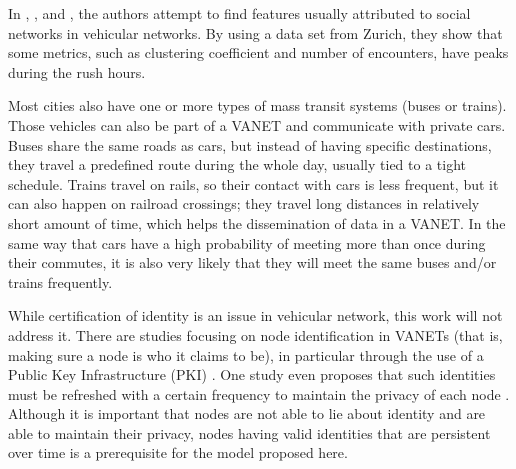 
In \cite{da2013effective}, \cite{cunha2014vehicular}, and \cite{cunha2014possible}, the authors attempt to find features usually attributed to social networks in vehicular networks.
By using a data set from Zurich, they show that some metrics, such as clustering coefficient and number of encounters, have peaks during the rush hours.


Most cities also have one or more types of mass transit systems (buses or trains).
Those vehicles can also be part of a VANET and communicate with private cars.
Buses share the same roads as cars, but instead of having specific destinations, they travel a predefined route during the whole day, usually tied to a tight schedule.
Trains travel on rails, so their contact with cars is less frequent, but it can also happen on railroad crossings; they travel long distances in relatively short amount of time, which helps the dissemination of data in a VANET.
In the same way that cars have a high probability of meeting more than once during their commutes, it is also very likely that they will meet the same buses and/or trains frequently.


While certification of identity is an issue in vehicular network, this work will not address it.
There are studies focusing on node identification in VANETs (that is, making sure a node is who it claims to be), in particular through the use of a Public Key Infrastructure (PKI) \cite{wasef2010complementing} 
\cite{kumar2015intelligent}.
One study even proposes that such identities must be refreshed with a certain frequency to maintain the privacy of each node \cite{golle2004detecting}.
Although it is important that nodes are not able to lie about identity and are able to maintain their privacy, nodes having valid identities that are persistent over time is a prerequisite for the model proposed here.

